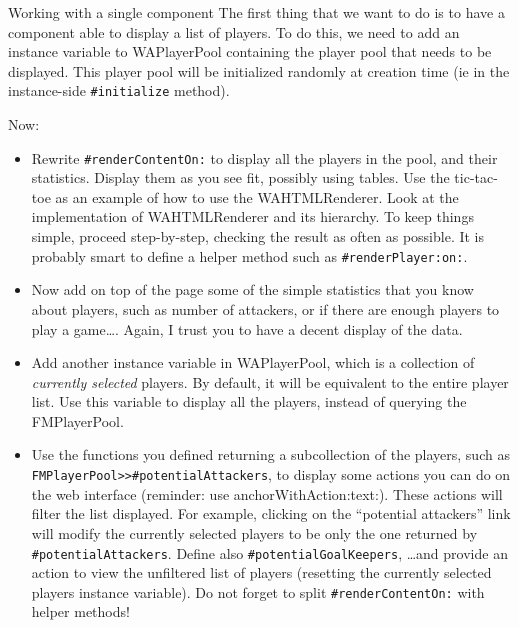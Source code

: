 \documentclass[a4paper,10pt]{scrartcl}
\begin{document}
\begin{exercise}{Working with a single component}
The first thing that we want to do is to have a component able to display
a list of players. To do this, we need to add an instance variable to
WAPlayerPool containing the player pool that needs to be displayed.
This player pool will be initialized randomly at creation time (ie
in the instance-side \verb+#initialize+ method).

Now:

\begin{itemize}
	\item Rewrite \verb+#renderContentOn:+ to display all the players in the pool, and their statistics. Display them as you see fit, possibly using tables. Use the tic-tac-toe as an example of how to use the WAHTMLRenderer. Look at the implementation of WAHTMLRenderer and its hierarchy. To keep things simple, proceed step-by-step, checking the result as often as possible.  It is probably smart to define a helper method such as \verb+#renderPlayer:on:+.
	\item Now add on top of the page some of the simple statistics that you know about players, such as number of attackers, or if there are enough players to play a game\ldots. Again, I trust you to have a decent display of the data.
	\item Add another instance variable in WAPlayerPool, which is a collection of \emph{currently selected} players. By default, it will be equivalent to the entire player list. Use this variable to display all the players, instead of querying the FMPlayerPool.
	\item Use the functions you defined returning a subcollection of the players, such as \verb+FMPlayerPool>>#potentialAttackers+, to display some actions you can do on the web interface (reminder: use anchorWithAction:text:). These actions will filter the list displayed. For example, clicking on the ``potential attackers'' link will modify the currently selected players to be only the one returned by \verb+#potentialAttackers+. Define also 
		\verb+#potentialGoalKeepers+, \ldots and provide an action to view the unfiltered list of players (resetting the currently selected players instance variable). \hint{}Do not forget to split \verb+#renderContentOn:+ with helper methods!
\end{itemize}
\end{exercise}
\end{document}

